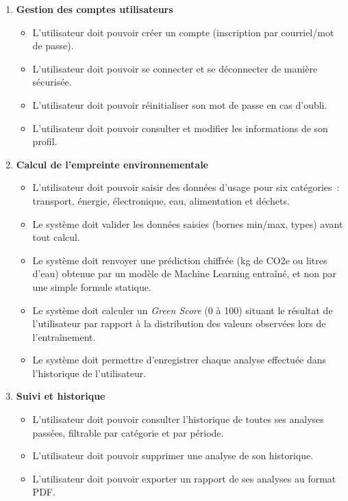 \begin{enumerate}
    \item \textbf{Gestion des comptes utilisateurs}
    \begin{itemize}
        \item[BF1.] L'utilisateur doit pouvoir créer un compte (inscription par courriel/mot de passe).
        \item[BF2.] L'utilisateur doit pouvoir se connecter et se déconnecter de manière sécurisée.
        \item[BF3.] L'utilisateur doit pouvoir réinitialiser son mot de passe en cas d'oubli.
        \item[BF4.] L'utilisateur doit pouvoir consulter et modifier les informations de son profil.
    \end{itemize}
    \item \textbf{Calcul de l'empreinte environnementale}
    \begin{itemize}
        \item[BF5.] L'utilisateur doit pouvoir saisir des données d'usage pour six catégories~: transport, énergie, électronique, eau, alimentation et déchets.
        \item[BF6.] Le système doit valider les données saisies (bornes min/max, types) avant tout calcul.
        \item[BF7.] Le système doit renvoyer une prédiction chiffrée (kg de CO2e ou litres d'eau) obtenue par un modèle de Machine Learning entraîné, et non par une simple formule statique.
        \item[BF8.] Le système doit calculer un \textit{Green Score} (0 à 100) situant le résultat de l'utilisateur par rapport à la distribution des valeurs observées lors de l'entraînement.
        \item[BF9.] Le système doit permettre d'enregistrer chaque analyse effectuée dans l'historique de l'utilisateur.
    \end{itemize}
    \item \textbf{Suivi et historique}
    \begin{itemize}
        \item[BF10.] L'utilisateur doit pouvoir consulter l'historique de toutes ses analyses passées, filtrable par catégorie et par période.
        \item[BF11.] L'utilisateur doit pouvoir supprimer une analyse de son historique.
        \item[BF12.] L'utilisateur doit pouvoir exporter un rapport de ses analyses au format PDF.

\end{itemize}
\end{enumerate}
